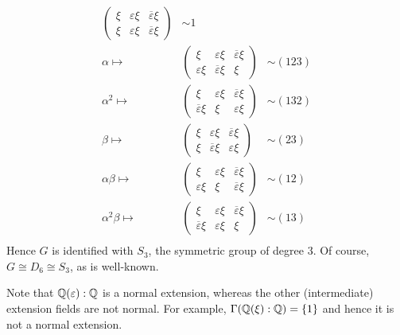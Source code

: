 \begin{example}
\[\begin{matrix}
\begin{pmatrix}
				\xi & \varepsilon \xi & \overline{\varepsilon} \xi \\
				\xi & \varepsilon \xi & \overline{\varepsilon} \xi
			\end{pmatrix}
			& \sim 1 \\
			\alpha \mapsto &
			\begin{pmatrix}
			\xi & \varepsilon \xi & \overline{\varepsilon} \xi \\
			\varepsilon \xi & \overline{\varepsilon} \xi & \xi
			\end{pmatrix}
			& \sim (123) \\
			\alpha^2 \mapsto &
			\begin{pmatrix}
			\xi & \varepsilon \xi & \overline{\varepsilon} \xi \\
			\overline{\varepsilon} \xi & \xi & \varepsilon \xi
			\end{pmatrix}
			& \sim (132) \\
			\beta \mapsto &
			\begin{pmatrix}
			\xi & \varepsilon \xi & \overline{\varepsilon} \xi \\
			\xi & \overline{\varepsilon} \xi & \varepsilon \xi
			\end{pmatrix}
			& \sim (23) \\
			\alpha \beta \mapsto &
			\begin{pmatrix}
			\xi & \varepsilon \xi & \overline{\varepsilon} \xi \\
			\varepsilon \xi & \xi & \overline{\varepsilon} \xi
			\end{pmatrix}
			& \sim (12) \\
			\alpha^2 \beta \mapsto &
			\begin{pmatrix}
			\xi & \varepsilon \xi & \overline{\varepsilon} \xi \\
			\overline{\varepsilon} \xi & \varepsilon \xi & \xi
			\end{pmatrix}
			& \sim (13) \\
		\end{matrix}
	\]
	Hence $G$ is identified with $S_3$, the symmetric group of degree $3$. Of course, $G \cong D_6 \cong S_3$, as is well-known.
	
	Note that $\mathbb{Q}(\varepsilon) : \mathbb{Q}$ is a normal extension, whereas the other (intermediate) extension fields are not normal. For example, $\Gamma(\mathbb{Q}(\xi) : \mathbb{Q}) = \{1\}$ and hence it is not a normal extension.
\end{example}


